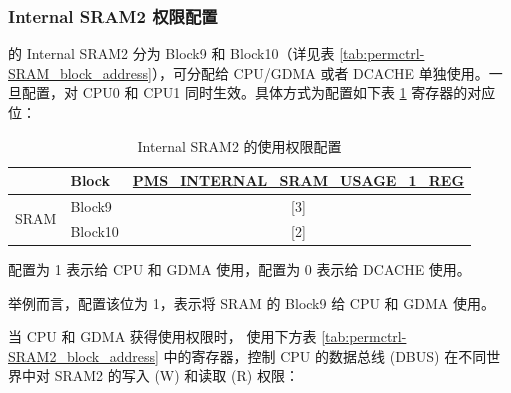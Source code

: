 \documentclass[main\_\_CN.tex]{subfiles}
\begin{document}
\subsubsection{Internal SRAM2 权限配置}\label{sec:permctrl_sram2}

\chipname{} 的 Internal SRAM2 分为 Block9 和 Block10（详见表 \ref{tab:permctrl-SRAM_block_address}），可分配给 CPU/GDMA 或者 DCACHE 单独使用。一旦配置，对 CPU0 和 CPU1 同时生效。具体方式为配置如下表 \ref{tab:permctrl-sram2_accessconfig} 寄存器的对应位：

\begin{table}[H]
    \centering
    \caption{Internal SRAM2 的使用权限配置}
    \label{tab:permctrl-sram2_accessconfig}
    \begin{threeparttable}
    \begin{tabular}{|l|l|c|}
    \hline
    \rowcolor{lightgray}
                          &\textbf{Block}  & \textbf{\hyperref[regdesc:PMSINTERNALSRAMUSAGE1REG]{PMS\_INTERNAL\_SRAM\_USAGE\_1\_REG}\tnote{A}}\\\hline
    \multirow{2}{*}{SRAM} & Block9        & [3]\tnote{B} \\\cline{2-3}
                          & Block10        & [2] \\\hline
    \end{tabular}
        \begin{tablenotes}
        \item[A] 配置为 1 表示给 CPU 和 GDMA 使用，配置为 0 表示给 DCACHE 使用。
        \item[B] 举例而言，配置该位为 1，表示将 SRAM 的 Block9 给 CPU 和 GDMA 使用。
        \end{tablenotes}
    \end{threeparttable}
\end{table}

当 CPU 和 GDMA 获得使用权限时，\chipname{} 使用下方表 \ref{tab:permctrl-SRAM2_block_address} 中的寄存器，控制 CPU 的数据总线 (DBUS) 在不同世界中对 SRAM2 的写入 (W) 和读取 (R) 权限：
\end{document}
